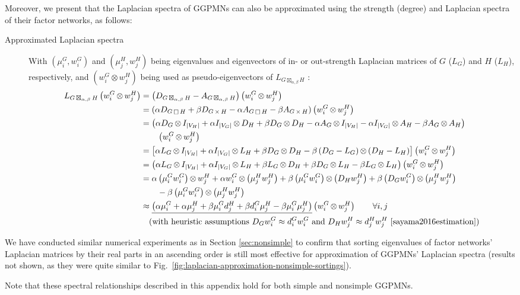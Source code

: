 \documentclass{article}
\DeclareMathOperator*{\CP}{\Box}
\DeclareMathOperator*{\DP}{\times}
\DeclareMathOperator*{\KP}{\otimes}
\DeclareMathOperator*{\GP}{\boxtimes}
\begin{document}
Moreover, we present that the Laplacian spectra of GGPMNs can also be
approximated using the strength (degree) and Laplacian spectra of
their factor networks, as follows:
\begin{description}
\item[Approximated Laplacian spectra] With $\left( \mu^G_i, w^G_i
  \right)$ and $\left( \mu^H_j, w^H_j \right)$ being eigenvalues and
  eigenvectors of in- or out-strength Laplacian matrices of $G$
  ($L_G$) and $H$ ($L_H$), respectively, and $\left( w^G_i \KP w^H_j
  \right)$ being used as pseudo-eigenvectors of $L_{G \GP_{\alpha,
      \beta} H}$ \cite{sayama2016estimation}:
\begin{align}
L_{G \GP_{\alpha, \beta} H} \left( w^G_i \KP w^H_j \right) &=
\left(D_{G \GP_{\alpha, \beta} H} - A_{G \GP_{\alpha, \beta} H} \right) \left( w^G_i \KP w^H_j \right)\\
&= \left( \alpha D_{G \CP H} + \beta D_{G \DP H} - \alpha A_{G \CP H} - \beta A_{G \DP H} \right) \left( w^G_i \KP w^H_j \right)\\
&= \left( \alpha D_G \KP I_{|V_H|} + \alpha I_{|V_G|} \KP D_H + \beta D_G \KP D_H 
 - \alpha A_G \KP I_{|V_H|} - \alpha I_{|V_G|} \KP A_H - \beta A_G \KP A_H \right) \nonumber\\
& \quad \quad \left( w^G_i \KP w^H_j \right)\\
&= \left[ \alpha L_G \KP I_{|V_H|} + \alpha I_{|V_G|} \KP L_H + \beta D_G \KP D_H - \beta \left(D_G - L_G \right) \KP \left(D_H - L_H \right) \right] \left( w^G_i \KP w^H_j \right)\\
&= \left( \alpha L_G \KP I_{|V_H|} + \alpha I_{|V_G|} \KP L_H + \beta L_G \KP D_H + \beta D_G \KP L_H - \beta L_G \KP L_H \right) \left( w^G_i \KP w^H_j \right)\\
&= \alpha \left(\mu^G_i w^G_i \right) \KP w^H_j + \alpha w^G_i \KP \left( \mu^H_j w^H_j \right)+ \beta \left(\mu^G_i w^G_i \right) \KP \left( D_H w^H_j \right)+ \beta \left(D_G w^G_i \right) \KP \left( \mu^H_j w^H_j \right) \nonumber \\
& \quad \quad - \beta \left(\mu^G_i w^G_i \right) \KP \left( \mu^H_j w^H_j \right)\\
&\approx \underline{\left( \alpha \mu^G_i + \alpha \mu^H_j + \beta \mu^G_i d^H_j + \beta d^G_i \mu^H_j - \beta \mu^G_i \mu^H_j \right)} \left( w^G_i \KP w^H_j \right) \quad \quad \forall i, j\\
& \quad \text{(with heuristic assumptions $D_G w^G_i \approx d^G_i w^G_i$ and $D_H w^H_j \approx d^H_j w^H_j$ \cite{sayama2016estimation})} \nonumber
\end{align}
\end{description}
We have conducted similar numerical experiments as in Section
\ref{sec:nonsimple} to confirm that sorting eigenvalues of factor
networks' Laplacian matrices by their real parts in an ascending order
is still most effective for approximation of GGPMNs' Laplacian spectra
(results not shown, as they were quite similar to
Fig.~\ref{fig:laplacian-approximation-nonsimple-sortings}).

Note that these spectral relationships described in this appendix hold
for both simple and nonsimple GGPMNs.



\end{document}
